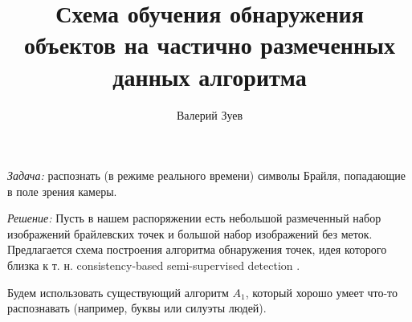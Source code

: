 \documentclass[a4paper,12pt]{article} %
\begin{document}
\title{Схема обучения обнаружения объектов на частично размеченных данных алгоритма}
\author{Валерий Зуев}
\maketitle

\emph{Задача:} распознать (в режиме реального времени) символы Брайля, попадающие в поле зрения камеры.

\emph{Решение:} Пусть в нашем распоряжении есть небольшой размеченный набор изображений брайлевских точек и большой набор изображений без меток.
Предлагается схема построения алгоритма обнаружения точек, идея которого близка к т. н. consistency-based semi-supervised detection \cite{jeong2019} \cite{Misra_2015_CVPR}.

Будем использовать существующий алгоритм $ A_1 $, который хорошо умеет что-то распознавать (например, буквы или силуэты людей).
\end{document}
